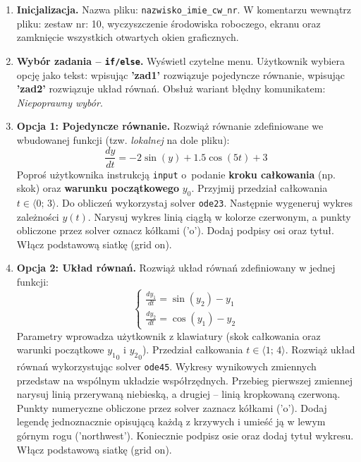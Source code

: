 \documentclass[a4paper,11pt]{article}
\begin{document}
\begin{enumerate}[leftmargin=*, label=\textbf{\arabic*.}, itemsep=2pt]

  \item \textbf{Inicjalizacja.}
    Nazwa pliku: \texttt{nazwisko\_imie\_cw\_nr}. W komentarzu wewnątrz pliku: zestaw nr: 10, wyczyszczenie środowiska roboczego, ekranu oraz zamknięcie wszystkich otwartych okien graficznych.

  \item \textbf{Wybór zadania -- \texttt{if/else}.}
    Wyświetl czytelne menu. Użytkownik wybiera opcję jako tekst: wpisując \textbf{'zad1'} rozwiązuje pojedyncze równanie, wpisując \textbf{'zad2'} rozwiązuje układ równań. Obsłuż wariant błędny komunikatem: \textit{Niepoprawny wybór}.

  \item \textbf{Opcja 1: Pojedyncze równanie.}
    Rozwiąż równanie zdefiniowane we wbudowanej funkcji (tzw. \textit{lokalnej} na dole pliku):
    \[ \frac{dy}{dt} = -2\sin(y) + 1.5\cos(5t) + 3 \]
    Poproś użytkownika instrukcją \texttt{input} o~podanie \textbf{kroku całkowania} (np. skok) oraz \textbf{warunku początkowego} $y_0$. Przyjmij przedział całkowania $t \in \langle 0;\,3 \rangle$.
    Do obliczeń wykorzystaj solver \texttt{ode23}. Następnie wygeneruj wykres zależności $y(t)$. Narysuj wykres linią ciągłą w kolorze czerwonym, a punkty obliczone przez solver oznacz kółkami ('o'). Dodaj podpisy osi oraz tytuł. Włącz podstawową siatkę (grid on).

  \item \textbf{Opcja 2: Układ równań.}
    Rozwiąż układ równań zdefiniowany w jednej funkcji:\\[-0.5em]
    \[
    \begin{cases}
      \frac{dy_1}{dt} = \sin(y_2) - y_1 \\
      \frac{dy_2}{dt} = \cos(y_1) - y_2
    \end{cases}
    \]
    Parametry wprowadza użytkownik z klawiatury (skok całkowania oraz warunki początkowe $ {y_1}_{0} $ i $ {y_2}_{0} $). Przedział całkowania $t \in \langle 1;\,4 \rangle$.
    Rozwiąż układ równań wykorzystując solver \texttt{ode45}. Wykresy wynikowych zmiennych przedstaw na wspólnym układzie współrzędnych. Przebieg pierwszej zmiennej narysuj linią przerywaną niebieską, a drugiej -- linią kropkowaną czerwoną. Punkty numeryczne obliczone przez solver zaznacz kółkami ('o'). Dodaj legendę jednoznacznie opisującą każdą z krzywych i umieść ją w lewym górnym rogu ('northwest'). Koniecznie podpisz osie oraz dodaj tytuł wykresu. Włącz podstawową siatkę (grid on).

\end{enumerate}
\end{document}
